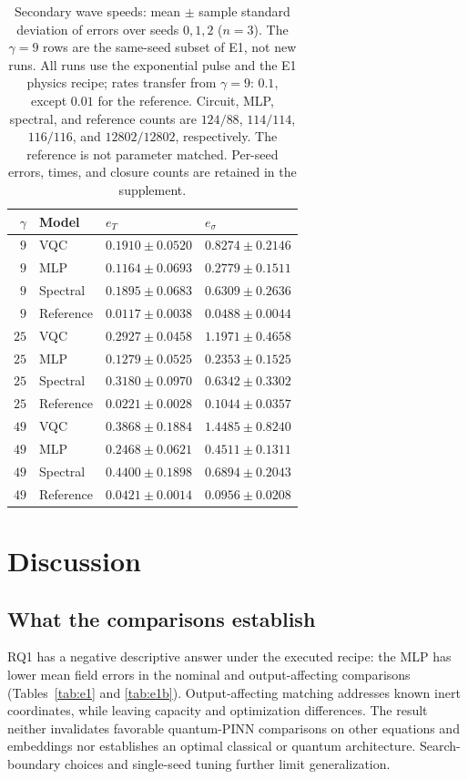 \documentclass[11pt]{article}
\begin{document}
\begin{table}[htbp]
\centering\small
\caption{Secondary wave speeds: mean $\pm$ sample standard deviation of
errors over seeds $0,1,2$ ($n=3$). The $\gamma=9$ rows are the same-seed
subset of E1, not new runs. All runs use the exponential pulse and the
E1 physics recipe; rates transfer from $\gamma=9$: $0.1$, except $0.01$
for the reference. Circuit, MLP, spectral, and reference counts are
$124/88$, $114/114$, $116/116$, and $12802/12802$, respectively.
The reference is not parameter matched. Per-seed errors, times, and
closure counts are retained in the supplement.}
\label{tab:gamma}
\begin{tabular}{rlll}
\toprule
$\gamma$ & Model & $e_T$ & $e_\sigma$ \\
\midrule
$9$ & VQC & $0.1910\pm0.0520$ & $0.8274\pm0.2146$ \\
$9$ & MLP & $0.1164\pm0.0693$ & $0.2779\pm0.1511$ \\
$9$ & Spectral & $0.1895\pm0.0683$ & $0.6309\pm0.2636$ \\
$9$ & Reference & $0.0117\pm0.0038$ & $0.0488\pm0.0044$ \\
\midrule
$25$ & VQC & $0.2927\pm0.0458$ & $1.1971\pm0.4658$ \\
$25$ & MLP & $0.1279\pm0.0525$ & $0.2353\pm0.1525$ \\
$25$ & Spectral & $0.3180\pm0.0970$ & $0.6342\pm0.3302$ \\
$25$ & Reference & $0.0221\pm0.0028$ & $0.1044\pm0.0357$ \\
\midrule
$49$ & VQC & $0.3868\pm0.1884$ & $1.4485\pm0.8240$ \\
$49$ & MLP & $0.2468\pm0.0621$ & $0.4511\pm0.1311$ \\
$49$ & Spectral & $0.4400\pm0.1898$ & $0.6894\pm0.2043$ \\
$49$ & Reference & $0.0421\pm0.0014$ & $0.0956\pm0.0208$ \\
\bottomrule
\end{tabular}
\end{table}

\section{Discussion}

\subsection{What the comparisons establish}

RQ1 has a negative descriptive answer under the executed recipe: the MLP
has lower mean field errors in the nominal and output-affecting comparisons
(Tables~\ref{tab:e1} and \ref{tab:e1b}). Output-affecting matching addresses
known inert coordinates, while leaving capacity and optimization
differences. The result neither invalidates favorable quantum-PINN
comparisons on other equations and embeddings \citep{Berger2025} nor
establishes an optimal classical or quantum architecture. Search-boundary
choices and single-seed tuning further limit generalization.
\end{document}
